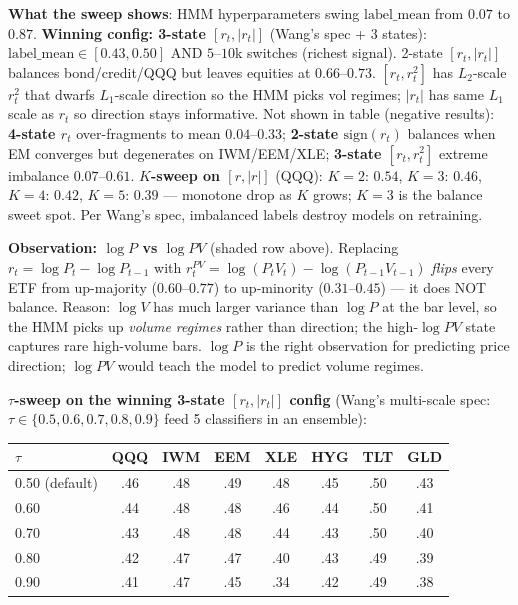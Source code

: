 \documentclass[11pt]{article}
\begin{document}
\smallskip
\textbf{What the sweep shows}: HMM hyperparameters swing $\mathrm{label\_mean}$ from $0.07$ to $0.87$. \textbf{Winning config: 3-state $[r_t, |r_t|]$} (Wang's spec + 3 states): $\mathrm{label\_mean}\in[0.43, 0.50]$ AND $5$--$10$k switches (richest signal). 2-state $[r_t,|r_t|]$ balances bond/credit/QQQ but leaves equities at $0.66$--$0.73$. $[r_t, r_t^2]$ has $L_2$-scale $r_t^2$ that dwarfs $L_1$-scale direction so the HMM picks vol regimes; $|r_t|$ has same $L_1$ scale as $r_t$ so direction stays informative. Not shown in table (negative results): \textbf{4-state $r_t$} over-fragments to mean $0.04$--$0.33$; \textbf{2-state $\mathrm{sign}(r_t)$} balances when EM converges but degenerates on IWM/EEM/XLE; \textbf{3-state $[r_t,r_t^2]$} extreme imbalance $0.07$--$0.61$. \textbf{$K$-sweep on $[r,|r|]$} (QQQ): $K{=}2$: $0.54$, $K{=}3$: $\mathbf{0.46}$, $K{=}4$: $0.42$, $K{=}5$: $0.39$ --- monotone drop as $K$ grows; $K{=}3$ is the balance sweet spot. Per Wang's spec, imbalanced labels destroy models on retraining.

\textbf{Observation: $\log P$ vs $\log P V$} (shaded row above). Replacing $r_t = \log P_t - \log P_{t-1}$ with $r_t^{PV} = \log(P_t V_t) - \log(P_{t-1} V_{t-1})$ \emph{flips} every ETF from up-majority ($0.60$--$0.77$) to up-minority ($0.31$--$0.45$) --- it does NOT balance. Reason: $\log V$ has much larger variance than $\log P$ at the bar level, so the HMM picks up \emph{volume regimes} rather than direction; the high-$\log P V$ state captures rare high-volume bars. $\log P$ is the right observation for predicting price direction; $\log P V$ would teach the model to predict volume regimes.

\textbf{$\tau$-sweep on the winning 3-state $[r_t,|r_t|]$ config} (Wang's multi-scale spec: $\tau \in \{0.5, 0.6, 0.7, 0.8, 0.9\}$ feed 5 classifiers in an ensemble):

\smallskip
\setlength{\tabcolsep}{5pt}
\begin{footnotesize}
\begin{tabular}{@{}lccccccc@{}}
\toprule
\textbf{$\tau$} & QQQ & IWM & EEM & XLE & HYG & TLT & GLD \\
\midrule
0.50 (default) & .46 & .48 & .49 & .48 & .45 & .50 & .43 \\
0.60 & .44 & .48 & .48 & .46 & .44 & .50 & .41 \\
0.70 & .43 & .48 & .48 & .44 & .43 & .50 & .40 \\
0.80 & .42 & .47 & .47 & .40 & .43 & .49 & .39 \\
0.90 & .41 & .47 & .45 & .34 & .42 & .49 & .38 \\
\bottomrule
\end{tabular}
\end{footnotesize}
\setlength{\tabcolsep}{6pt}
\end{document}
